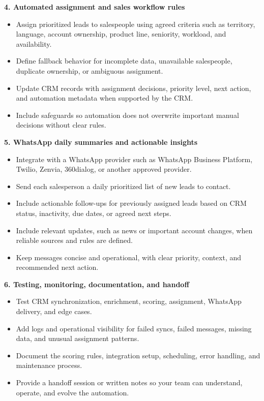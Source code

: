 \documentclass[11pt,a4paper]{article}
\begin{document}
\textbf{4. Automated assignment and sales workflow rules}\par

\begin{itemize}
\item Assign prioritized leads to salespeople using agreed criteria such as territory, language, account ownership, product line, seniority, workload, and availability.
\item Define fallback behavior for incomplete data, unavailable salespeople, duplicate ownership, or ambiguous assignment.
\item Update CRM records with assignment decisions, priority level, next action, and automation metadata when supported by the CRM.
\item Include safeguards so automation does not overwrite important manual decisions without clear rules.
\end{itemize}

\textbf{5. WhatsApp daily summaries and actionable insights}\par

\begin{itemize}
\item Integrate with a WhatsApp provider such as WhatsApp Business Platform, Twilio, Zenvia, 360dialog, or another approved provider.
\item Send each salesperson a daily prioritized list of new leads to contact.
\item Include actionable follow-ups for previously assigned leads based on CRM status, inactivity, due dates, or agreed next steps.
\item Include relevant updates, such as news or important account changes, when reliable sources and rules are defined.
\item Keep messages concise and operational, with clear priority, context, and recommended next action.
\end{itemize}

\textbf{6. Testing, monitoring, documentation, and handoff}\par

\begin{itemize}
\item Test CRM synchronization, enrichment, scoring, assignment, WhatsApp delivery, and edge cases.
\item Add logs and operational visibility for failed syncs, failed messages, missing data, and unusual assignment patterns.
\item Document the scoring rules, integration setup, scheduling, error handling, and maintenance process.
\item Provide a handoff session or written notes so your team can understand, operate, and evolve the automation.
\end{itemize}
\end{document}
